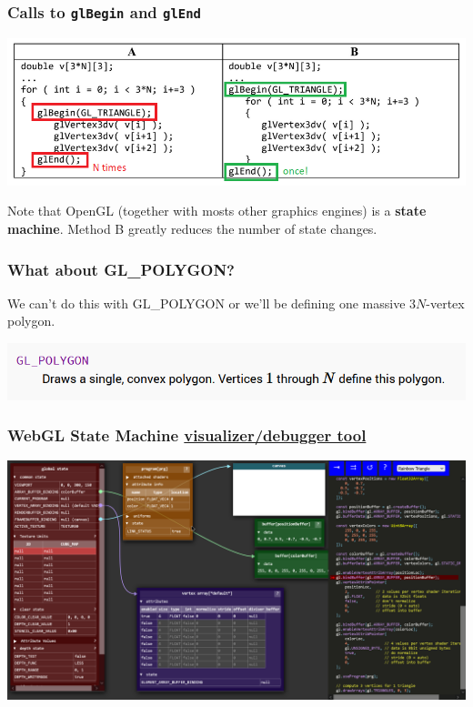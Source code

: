 \documentclass{beamer}
\begin{document}
\begin{frame}
    \frametitle{Calls to \texttt{glBegin} and \texttt{glEnd}}

    \begin{center}
        \includegraphics[scale=0.6]{q7-annot.png}
    \end{center}

    Note that OpenGL (together with mosts other graphics engines)
    is a \textbf{state machine}. Method B greatly reduces the number of state changes.

\end{frame}

\begin{frame}
    \frametitle{What about GL\_POLYGON?}

    We can't do this with GL\_POLYGON or we'll be defining one massive
    $3N$-vertex polygon.

    \begin{center}
        \includegraphics[scale=0.6]{gl-polygon.png}
    \end{center}

\end{frame}

\begin{frame}
    \frametitle{WebGL State Machine \href{https://webglfundamentals.org/webgl/lessons/resources/webgl-state-diagram.html}{visualizer/debugger tool}}

    \begin{center}
        \includegraphics[scale=0.2]{webgl-fsm.png}
    \end{center}

\end{frame}
\end{document}
